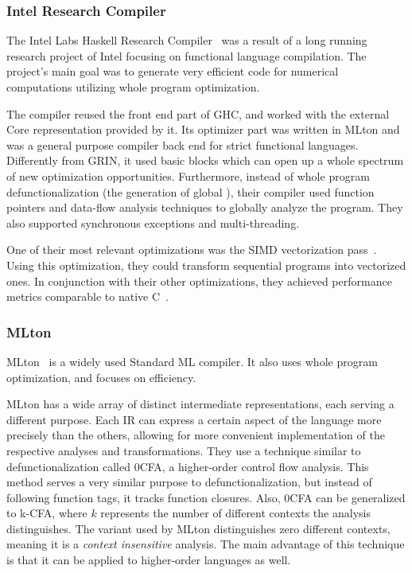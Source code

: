 \documentclass[main.tex]{subfiles}
\begin{document}
	\subsubsection{Intel Research Compiler}
	
	The Intel Labs Haskell Research Compiler~\cite{hrc} was a result of a long running research project of Intel focusing on functional language compilation. The project's main goal was to generate very efficient code for numerical computations utilizing whole program optimization.
	
	The compiler reused the front end part of GHC, and worked with the external Core representation provided by it. Its optimizer part was written in MLton and was a general purpose compiler back end for strict functional languages. Differently from GRIN, it used basic blocks which can open up a whole spectrum of new optimization opportunities. Furthermore, instead of whole program defunctionalization (the generation of global ), their compiler used function pointers and data-flow analysis techniques to globally analyze the program. They also supported synchronous exceptions and multi-threading.
	
	One of their most relevant optimizations was the SIMD vectorization pass~\cite{hrc-simd}. Using this optimization, they could transform sequential programs into vectorized ones. In conjunction with their other optimizations, they achieved performance metrics comparable to native C~\cite{haskell-gap}.
	
	\subsubsection{MLton}
	
	MLton~\cite{mlton} is a widely used Standard ML compiler. It also uses whole program optimization, and focuses on efficiency.
	
	MLton has a wide array of distinct intermediate representations, each serving a different purpose. Each IR can express a certain aspect of the language more precisely than the others, allowing for more convenient implementation of the respective analyses and transformations. They use a technique similar to defunctionalization called 0CFA, a higher-order control flow analysis. This method serves a very similar purpose to defunctionalization, but instead of following function tags, it tracks function closures. Also, 0CFA can be generalized to k-CFA, where $k$ represents the number of different contexts the analysis distinguishes. The variant used by MLton distinguishes zero different contexts, meaning it is a \textit{context insensitive} analysis. The main advantage of this technique is that it can be applied to higher-order languages as well. 
	
\end{document}
